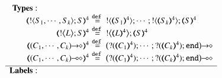 \begin{figure}[t]
\small
\[
\begin{array}{rcl}
{\bf Types:}\hspace{2.2cm}\\
		\tmap{\btout{S_1, \cdots, S_k}S}{4}
		&\!\!\!\!\defeq\!\!\!\!&
		\btout{\tmap{S_1}{4}} \cdots ; \btout{\tmap{S_k}{4}}\tmap{S}{4}
		\\
		\tmap{\bbtout{L} S}{4}
		&\!\!\!\!\defeq\!\!\!\!&
		\bbtout{\mapt{L}^{4}}\mapt{S}^{4}
		\\
		\tmap{\shot{(C_1, \cdots, C_k)}}{4}
		&\!\!\!\!\defeq\!\!\!\!&
		\shot{\big(\btinp{\tmap{C_1}{4}} \cdots; \btinp{\tmap{C_k}{4}}\tinact\big)}
		\\
		\tmap{\lhot{(C_1, \cdots, C_k)}}{4}
		&\!\!\!\!\defeq\!\!\!\!&
		\lhot{\big(\btinp{\tmap{C_1}{4}} \cdots; \btinp{\tmap{C_k}{4}}\tinact\big)}
		\\[1mm]
\hline
{\bf Labels:}\hspace{2.2cm}\\

\end{array}\]
\end{figure}

